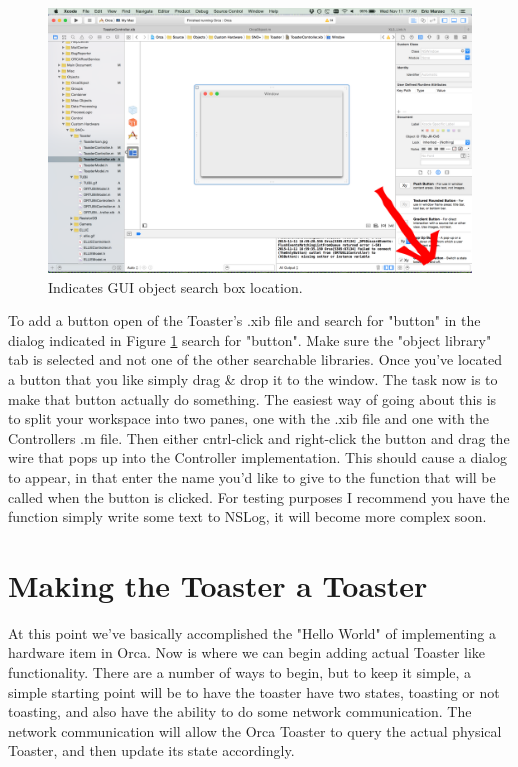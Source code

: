 \documentclass[12pt,a4paper]{article}
\begin{document}
  \begin{figure}
 \begin{center}
 \includegraphics[width=1.0\textwidth]{GUI_Search_Dialog}
 \caption{Indicates GUI object search box location.\label{fig:GUISearchDialog}}
 \end{center}
 \end{figure}
 
 To add a button open of the Toaster's .xib file and search for "button" in the dialog indicated in Figure \ref{fig:GUISearchDialog} search for "button". Make sure the "object library" tab is selected and not one of the other searchable libraries.
 Once you've located a button that you like simply drag \& drop it to the window.
 The task now is to make that button actually do something.
 The easiest way of going about this is to split your workspace into two panes, one with the .xib file and one with the Controllers .m file.
 Then either cntrl-click and right-click the button and drag the wire that pops up into the Controller implementation.
 This should cause a dialog to appear, in that enter the name you'd like to give to the function that will be called when the button is clicked.
 For testing purposes I recommend you have the function simply write some text to NSLog, it will become more complex soon.
 \section{Making the Toaster a Toaster}
 At this point we've basically accomplished the "Hello World" of implementing a hardware item in Orca. 
 Now is where we can begin adding actual Toaster like functionality.
 There are a number of ways to begin, but to keep it simple, a simple starting point will be to have the toaster have two states, toasting or not toasting, and also have the ability to do some network communication. 
 The network communication will allow the Orca Toaster to query the actual physical Toaster, and then update its state accordingly.
\end{document}
